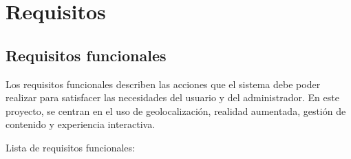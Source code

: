 
\section{Requisitos}
\subsection{Requisitos funcionales}
Los requisitos funcionales describen las acciones que el sistema debe poder realizar para satisfacer las necesidades del usuario y del administrador. En este proyecto, se centran en el uso de geolocalización, realidad aumentada, gestión de contenido y experiencia interactiva.

Lista de requisitos funcionales:

